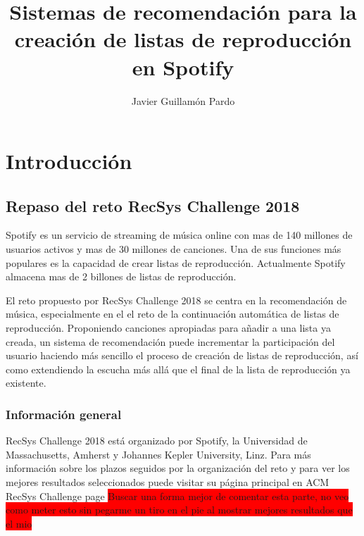 \documentclass{article}
\title{Sistemas de recomendación para la creación de listas de reproducción en Spotify}
\author{Javier Guillamón Pardo}
\begin{document}
	\maketitle
	\newpage
	\section{Introducción}
	\subsection{Repaso del reto RecSys Challenge 2018}

	Spotify es un servicio de streaming de música online  con mas de 140 millones de usuarios activos y mas de 30 millones de canciones. Una de sus funciones más populares es la capacidad de crear listas de reproducción. Actualmente Spotify almacena mas de 2 billones de listas de reproducción.

	El reto propuesto por RecSys Challenge 2018 se centra en la recomendación de música, especialmente en el el reto de la continuación automática de listas de reproducción. Proponiendo canciones apropiadas para añadir a una lista ya creada, un sistema de recomendación puede incrementar la participación del usuario haciendo más sencillo el proceso de creación de listas de reproducción, así como extendiendo la escucha más allá que el final de la lista de reproducción ya existente.
	
	\subsubsection{Información general}
	RecSys Challenge 2018 está organizado por Spotify, la Universidad de Massachusetts, Amherst y Johannes Kepler University, Linz. Para más información sobre los plazos seguidos por la organización del reto y para ver los mejores resultados seleccionados puede visitar su página principal en ACM RecSys Challenge page 
\colorbox{red}{Buscar una forma mejor de comentar esta parte, no veo como meter esto sin pegarme un tiro en el pie al mostrar mejores resultados que el mio}
\end{document}
